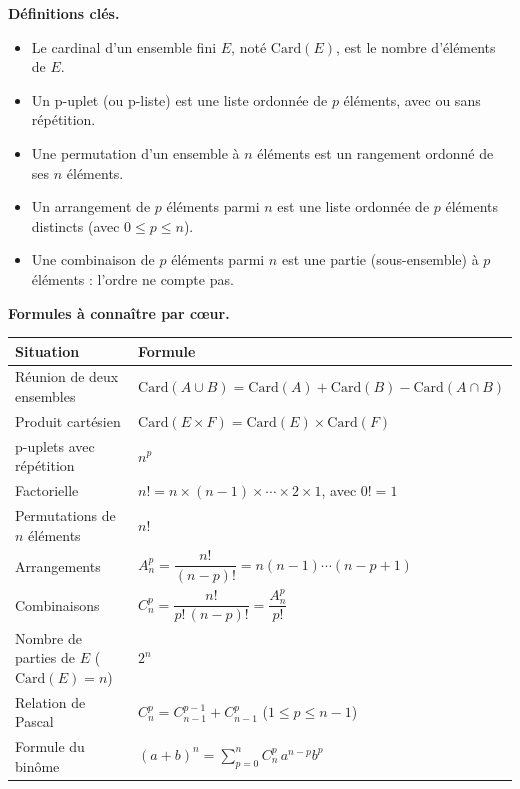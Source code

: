 \documentclass[11pt]{article}
\newcommand{\cle}[1]{{\popxbold\color{popdark}#1}}
\begin{document}
\begin{aretenir}
\textbf{Définitions clés.}
\begin{itemize}
\item Le \cle{cardinal} d'un ensemble fini $E$, noté $\mathrm{Card}(E)$, est le nombre d'éléments de $E$.
\item Un \cle{p-uplet} (ou p-liste) est une liste ordonnée de $p$ éléments, avec ou sans répétition.
\item Une \cle{permutation} d'un ensemble à $n$ éléments est un rangement ordonné de ses $n$ éléments.
\item Un \cle{arrangement} de $p$ éléments parmi $n$ est une liste ordonnée de $p$ éléments distincts (avec $0\le p\le n$).
\item Une \cle{combinaison} de $p$ éléments parmi $n$ est une partie (sous-ensemble) à $p$ éléments : l'ordre ne compte pas.
\end{itemize}

\textbf{Formules à connaître par cœur.}
\begin{center}
\begin{tabularx}{\linewidth}{|l|X|}
\hline
\rowcolor{popblueL} \textbf{Situation} & \textbf{Formule} \\
\hline
Réunion de deux ensembles & $\mathrm{Card}(A\cup B)=\mathrm{Card}(A)+\mathrm{Card}(B)-\mathrm{Card}(A\cap B)$ \\
\hline
Produit cartésien & $\mathrm{Card}(E\times F)=\mathrm{Card}(E)\times\mathrm{Card}(F)$ \\
\hline
p-uplets avec répétition & $n^p$ \\
\hline
Factorielle & $n!=n\times(n-1)\times\cdots\times 2\times 1$, avec $0!=1$ \\
\hline
Permutations de $n$ éléments & $n!$ \\
\hline
Arrangements & $A_n^p=\dfrac{n!}{(n-p)!}=n(n-1)\cdots(n-p+1)$ \\
\hline
Combinaisons & $C_n^p=\dfrac{n!}{p!\,(n-p)!}=\dfrac{A_n^p}{p!}$ \\
\hline
Nombre de parties de $E$ ($\mathrm{Card}(E)=n$) & $2^n$ \\
\hline
Relation de Pascal & $C_n^p=C_{n-1}^{p-1}+C_{n-1}^{p}$ \quad ($1\le p\le n-1$) \\
\hline
Formule du binôme & $(a+b)^n=\displaystyle\sum_{p=0}^{n} C_n^p\, a^{n-p}b^{p}$ \\
\hline
\end{tabularx}
\end{center}


\end{aretenir}
\end{document}
